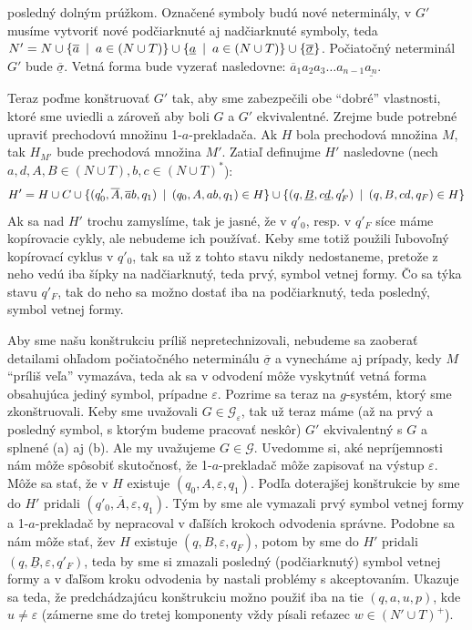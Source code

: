 \begin{dokaz}
\begin{enumerate}
\begin{enumerate}
      posledný dolným prúžkom. Označené symboly budú nové neterminály, v
      $G'$ musíme vytvoriť nové podčiarknuté aj nadčiarknuté symboly,
      teda $N'=N\cup\{\overline{a}\enspace |\enspace a\in(N\cup T
      )\}\cup\{\underline{a}\enspace |\enspace a\in(N\cup
      T)\}\cup\{\underline{\overline{\sigma}}\}$. Počiatočný neterminál
      $G'$ bude $\underline{\overline{\sigma}}$. Vetná forma bude
      vyzerať nasledovne: $\overline{a}_1 a_2 a_3\dots
      a_{n-1}\underline{a_n}$.
    \end{enumerate}
    Teraz poďme konštruovať $G'$ tak, aby sme zabezpečili obe
    ``dobré'' vlastnosti, ktoré sme uviedli a zároveň aby boli $G$ a
    $G'$ ekvivalentné. Zrejme bude potrebné upraviť prechodovú množinu
    1-$a$-prekladača. Ak $H$ bola prechodová množina $M$, tak $H_{M'}$
    bude prechodová množina $M'$. Zatiaľ definujme $H'$ nasledovne
    (nech $a,d,A,B\in(N\cup T),b,c\in(N\cup T)^*$):
    \[
    H'=H\cup C\cup\{(q'_0,\overline{A},\overline{a}b,q_1)\enspace |\enspace
    (q_0,A,ab,q_1)\in H\}\cup \{(q,\underline{B},c
    \underline{d},q'_F)\enspace |\enspace(q,B,cd,q_F)\in H\}
    \]
    Ak sa nad $H'$ trochu zamyslíme, tak je jasné, že v $q'_0$, resp.
    v $q'_F$ síce máme kopírovacie cykly, ale nebudeme ich používať.
    Keby sme totiž použili ľubovoľný kopírovací cyklus v $q'_0$, tak
    sa už z tohto stavu nikdy nedostaneme, pretože z neho vedú iba
    šípky na nadčiarknutý, teda prvý, symbol vetnej formy. Čo sa týka
    stavu $q'_F$, tak do neho sa možno dostať iba na podčiarknutý,
    teda posledný, symbol vetnej formy.

    Aby sme našu konštrukciu príliš nepretechnizovali, nebudeme sa
    zaoberať detailami oh\-ľa\-dom počiatočného neterminálu
    $\underline{\overline{\sigma}}$ a vynecháme aj prípady, kedy $M$
    ``príliš veľa'' vymazáva, teda ak sa v odvodení môže vyskytnúť
    vetná forma obsahujúca jediný symbol, prípadne $\varepsilon$.
    Pozrime sa teraz na $g$-systém, ktorý sme zkonštruovali. Keby sme
    uvažovali $G\in\mathcal{G_{\varepsilon}}$, tak už teraz máme (až
    na prvý a posledný symbol, s ktorým budeme pracovať neskôr) $G'$
    ekvivalentný s $G$ a splnené (a) aj (b). Ale my uvažujeme
    $G\in\mathcal{G}$. Uvedomme si, aké nepríjemnosti nám môže
    spôsobiť skutočnosť, že 1-$a$-prekladač môže zapisovať na výstup
    $\varepsilon$. Môže sa stať, že v $H$ existuje
    $(q_0,A,\varepsilon,q_1)$. Podľa doterajšej konštrukcie by sme do
    $H'$ pridali $(q'_0,\overline{A},\varepsilon,q_1)$. Tým by sme ale
    vymazali prvý symbol vetnej formy a 1-$a$-prekladač by nepracoval
    v ďaľších krokoch odvodenia správne. Podobne sa nám môže stať,
    že\linebreak v $H$ existuje $(q,B,\varepsilon,q_F)$, potom by sme
    do $H'$ pridali $(q,\underline{B},\varepsilon,q'_F)$, teda by sme
    si zmazali posledný (podčiarknutý) symbol vetnej formy a v ďaľšom
    kroku odvodenia by nastali problémy s akceptovaním. Ukazuje sa
    teda, že predchádzajúcu konštrukciu možno použiť iba na tie
    $(q,a,u,p)$, kde $u\neq\varepsilon$ (zámerne sme do tretej
    komponenty vždy písali reťazec $w\in(N'\cup T)^+$).


\end{enumerate}
\end{dokaz}
